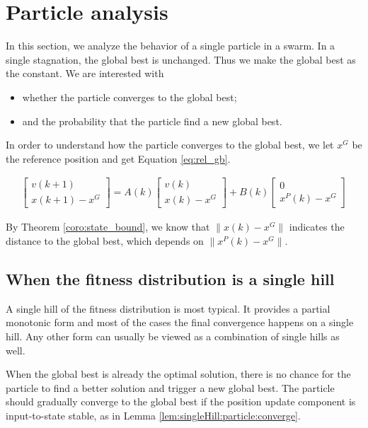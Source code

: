 \section{Particle analysis}
\label{sec:particle}

In this section, we analyze the behavior of a single particle in a swarm.
In a single stagnation, the global best is unchanged.
Thus we make the global best as the constant.
We are interested with 
\begin{itemize}
\item whether the particle converges to the global best;
\item and the probability that the particle find a new global best.
\end{itemize}

In order to understand how the particle converges to the global best, we let $ x^{G} $ be the reference position and get Equation \eqref{eq:rel_gb}.

\begin{equation}
\label{eq:rel_gb}
\begin{aligned}
\begin{bmatrix}
v(k+1) \\
x(k+1) - x^{G}
\end{bmatrix}
 = A(k) 
\begin{bmatrix}
v(k) \\
x(k) - x^{G}
\end{bmatrix}
+ B(k) 
\begin{bmatrix}
0 \\
x^{P}(k) - x^{G}
\end{bmatrix}
\end{aligned}
\end{equation}

By Theorem \ref{coro:state_bound}, we know that $ \lVert x(k) - x^{G} \rVert $ indicates the distance to the global best, which depends on  $ \lVert x^{P}(k) - x^{G} \rVert $.

\subsection{When the fitness distribution is a single hill}

A single hill of the fitness distribution is most typical.
It provides a partial monotonic form and most of the cases the final convergence happens on a single hill.
Any other form can usually be viewed as a combination of single hills as well.

When the global best is already the optimal solution, there is no chance for the particle to find a better solution and trigger a new global best.
The particle should gradually converge to the global best if the position update component is input-to-state stable, as in Lemma \ref{lem:singleHill:particle:converge}.

